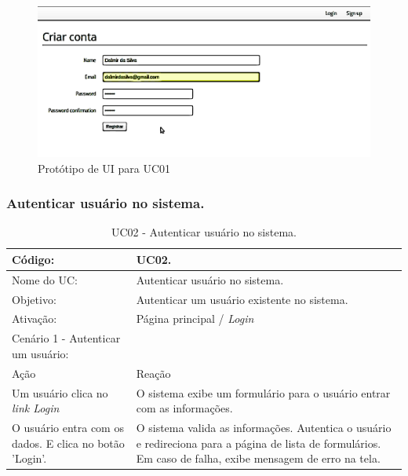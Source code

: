 \documentclass[11pt]{article}
\begin{document}
        \begin{figure}[h!]
          \centering
          \includegraphics[width=.9\textwidth]{create_user.png}
          \caption{Protótipo de UI para UC01}
        \end{figure}

    \clearpage

      \subsubsection{Autenticar usuário no sistema.}

        \begin{table}[h]
          \begin{center}
            \begin{tabular}{ | p{7cm} | p{8cm} | }
              \hline
              Código: \cellcolor{gray} & UC02. \\
              \hline
              Nome do UC: \cellcolor{gray} & Autenticar usuário no sistema. \\
              \hline
              Objetivo: \cellcolor{gray} & Autenticar um usuário existente no sistema. \\
              \hline
              Ativação: \cellcolor{gray} & Página principal / \em Login \\
              \hline
              \hline
              Cenário 1 - Autenticar um usuário: &  \\
              \hline
              Ação\cellcolor{gray} & Reação\cellcolor{gray} \\
              \hline
              Um usuário clica no \em link Login & O sistema exibe um formulário para o usuário entrar com as informações. \\
              \hline
              O usuário entra com os dados. E clica no botão 'Login'. & O sistema valida as informações. Autentica o usuário e redireciona para a página de lista de formulários. Em caso de falha, exibe mensagem de erro na tela. \\
              \hline
            \end{tabular}
            \caption{UC02 - Autenticar usuário no sistema.}
          \end{center}
        \end{table}
        
\end{document}
